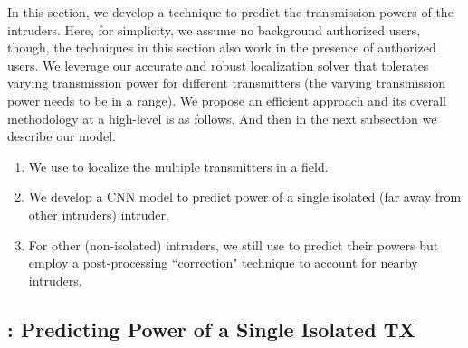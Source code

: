 In this section, we develop a technique to predict the transmission powers of the intruders. Here, for simplicity, we assume no background authorized users, though, the techniques in this section also work in the presence of authorized users. 
We leverage our accurate and robust localization solver that tolerates varying transmission power for different transmitters (the varying transmission power needs to be in a range).
We propose an efficient approach and its overall methodology at a high-level is as follows.
And then in the next subsection we describe our \power model.
\begin{enumerate}
\item We use \our to localize the multiple transmitters in a field. 
\item We develop a CNN model \power to predict power of a single isolated (far away from other intruders) intruder. 
\item For other (non-isolated) intruders, we still use \power to predict their powers but employ a post-processing ``correction" technique to account for nearby intruders. 
\end{enumerate}


\subsection{\power: Predicting Power of a Single Isolated TX}
\label{subsec:in-out-design}

